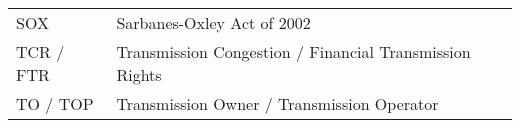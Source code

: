\begin{spacing}{1.0}
\begin{longtable}[htbp]{@{}p{} p{}@{}}
        SOX & Sarbanes-Oxley Act of 2002 \\ [0.5ex]
        TCR / FTR & Transmission Congestion / Financial Transmission Rights \\ [0.5ex]
        TO / TOP & Transmission Owner / Transmission Operator \\ [0.5ex]
	\end{longtable}
\end{spacing}

\pagebreak{}